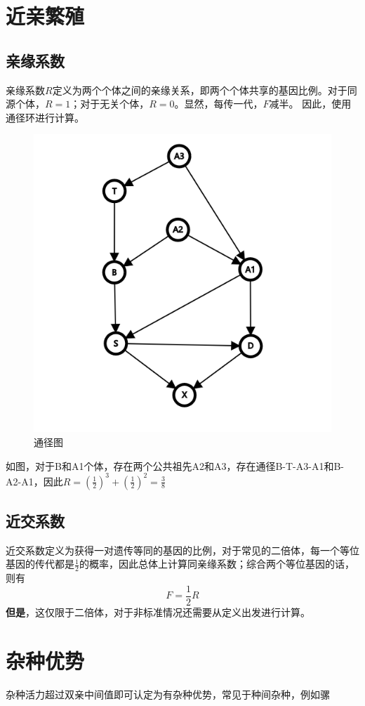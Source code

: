 \documentclass[a4paper, 12pt]{report}
\begin{document}
\section{近亲繁殖}
\subsection{亲缘系数}
亲缘系数\(R\)定义为两个个体之间的亲缘关系，即两个个体共享的基因比例。对于同源个体，\(R=1\)；对于无关个体，\(R=0\)。显然，每传一代，\(F\)减半。
因此，使用通径环进行计算。
\begin{figure}
    \centering
    \includegraphics[width=1\textwidth]{近交图.png}
    \caption{通径图}
    \label{近交图}
\end{figure}
如图，对于B和A1个体，存在两个公共祖先A2和A3，存在通径B-T-A3-A1和B-A2-A1，因此\(R=(\frac{1}{2})^3+(\frac{1}{2})^2=\frac{3}{8}\)
\subsection{近交系数}
近交系数定义为获得一对遗传等同的基因的比例，对于常见的二倍体，每一个等位基因的传代都是\(\frac{1}{2}\)的概率，因此总体上计算同亲缘系数；综合两个等位基因的话，则有
\[F=\frac{1}{2}R\]
\textbf{但是}，这仅限于二倍体，对于非标准情况还需要从定义出发进行计算。
\section{杂种优势}
杂种活力超过双亲中间值即可认定为有杂种优势，常见于种间杂种，例如骡
\end{document}
